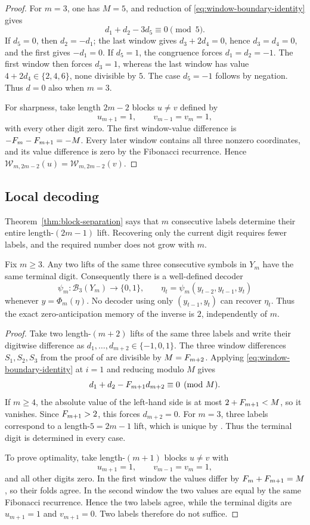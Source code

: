 \begin{proof}
For $m=3$, one has $M=5$, and reduction of \eqref{eq:window-boundary-identity} gives
\[
d_1+d_2-3d_5\equiv0\pmod5.
\]
If $d_5=0$, then $d_2=-d_1$; the last window gives $d_3+2d_4=0$, hence $d_3=d_4=0$, and the first gives $-d_1=0$. If $d_5=1$, the congruence forces $d_1=d_2=-1$. The first window then forces $d_3=1$, whereas the last window has value $4+2d_4\in\{2,4,6\}$, none divisible by $5$. The case $d_5=-1$ follows by negation. Thus $d=0$ also when $m=3$.

For sharpness, take length $2m-2$ blocks $u\ne v$ defined by
\[
u_{m+1}=1,
\qquad
v_{m-1}=v_m=1,
\]
with every other digit zero. The first window-value difference is
$-F_m-F_{m+1}=-M$. Every later window contains all three nonzero coordinates, and its value difference is zero by the Fibonacci recurrence. Hence $\mathcal{W}_{m,2m-2}(u)=\mathcal{W}_{m,2m-2}(v)$.
\end{proof}

\subsection{Local decoding}

Theorem~\ref{thm:block-separation} says that $m$ consecutive labels determine their entire length-$(2m-1)$ lift. Recovering only the current digit requires fewer labels, and the required number does not grow with $m$.

\begin{theorem}\label{thm:window-decoder}
Fix $m\ge3$. Any two lifts of the same three consecutive symbols in $Y_m$ have the same terminal digit. Consequently there is a well-defined decoder
\[
\psi_m:\mathcal{B}_3(Y_m)\to\{0,1\},
\qquad
\eta_t=\psi_m(y_{t-2},y_{t-1},y_t)
\]
whenever $y=\Phi_m(\eta)$. No decoder using only $(y_{t-1},y_t)$ can recover $\eta_t$. Thus the exact zero-anticipation memory of the inverse is $2$, independently of $m$.
\end{theorem}

\begin{proof}
Take two length-$(m+2)$ lifts of the same three labels and write their digitwise difference as $d_1,\ldots,d_{m+2}\in\{-1,0,1\}$. The three window differences $S_1,S_2,S_3$ from the proof of  are divisible by $M=F_{m+2}$. Applying \eqref{eq:window-boundary-identity} at $i=1$ and reducing modulo $M$ gives
\[
d_1+d_2-F_{m+1}d_{m+2}\equiv0\pmod M.
\]
If $m\ge4$, the absolute value of the left-hand side is at most $2+F_{m+1}<M$, so it vanishes. Since $F_{m+1}>2$, this forces $d_{m+2}=0$. For $m=3$, three labels correspond to a length-$5=2m-1$ lift, which is unique by . Thus the terminal digit is determined in every case.

To prove optimality, take length-$(m+1)$ blocks $u\ne v$ with
\[
u_{m+1}=1,
\qquad
v_{m-1}=v_m=1,
\]
and all other digits zero. In the first window the values differ by
$F_m+F_{m+1}=M$, so their folds agree. In the second window the two values are equal by the same Fibonacci recurrence. Hence the two labels agree, while the terminal digits are $u_{m+1}=1$ and $v_{m+1}=0$. Two labels therefore do not suffice.
\end{proof}

